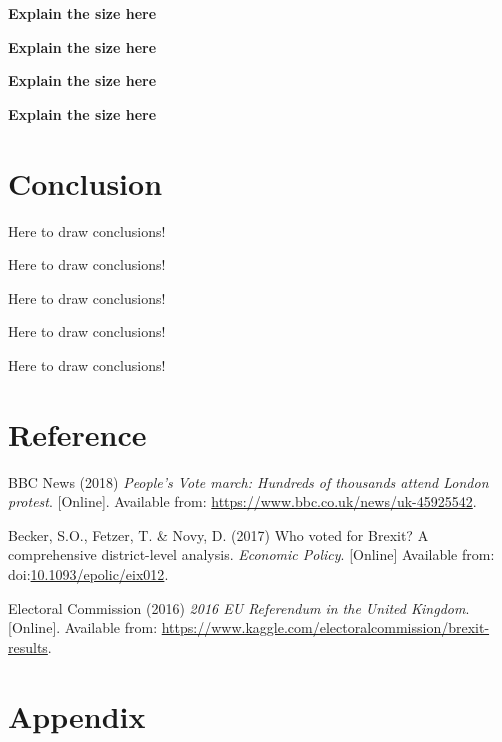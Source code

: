 \documentclass[]{article}
\begin{document}
\textbf{Explain the size here}

\textbf{Explain the size here}

\textbf{Explain the size here}

\textbf{Explain the size here}

\hypertarget{conclusion}{%
\section{Conclusion}\label{conclusion}}

Here to draw conclusions!

Here to draw conclusions!

Here to draw conclusions!

Here to draw conclusions!

Here to draw conclusions!

\newpage

\hypertarget{reference}{%
\section{Reference}\label{reference}}

\hypertarget{refs}{}
\leavevmode\hypertarget{ref-BBCNews2018}{}%
BBC News (2018) \emph{People's Vote march: Hundreds of thousands attend
London protest}. {[}Online{]}. Available from:
\url{https://www.bbc.co.uk/news/uk-45925542}.

\leavevmode\hypertarget{ref-Becker2017}{}%
Becker, S.O., Fetzer, T. \& Novy, D. (2017) Who voted for Brexit? A
comprehensive district-level analysis. \emph{Economic Policy}.
{[}Online{]} Available from:
doi:\href{https://doi.org/10.1093/epolic/eix012}{10.1093/epolic/eix012}.

\leavevmode\hypertarget{ref-ElectoralCommission2016}{}%
Electoral Commission (2016) \emph{2016 EU Referendum in the United
Kingdom}. {[}Online{]}. Available from:
\url{https://www.kaggle.com/electoralcommission/brexit-results}.

\hypertarget{appendix}{%
\section{Appendix}\label{appendix}}
\end{document}

